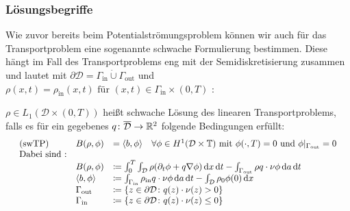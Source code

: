 \subsubsection{Lösungsbegriffe}
	Wie zuvor bereits beim Potentialströmungsproblem können wir auch für das Transportproblem eine sogenannte schwache Formulierung bestimmen. Diese hängt im Fall des Transportproblems eng mit der Semidiskretisierung zusammen und lautet mit $ \partial \mathcal{D} = \Gamma_{\text{in}} \dot{\cup} \Gamma_{\text{out}} $ und 
$\rho(x,t) = \rho_{\text{in}}(x,t) \text{ für } (x,t) \in \Gamma_{\text{in}} \times (0,T)$ :
\begin{Definition} 
	$ \rho \in L_1 (\mathcal{D} \times (0,T)) $ heißt schwache Lösung des linearen Transportproblems, falls es für ein gegebenes $ q \colon \overline{\mathcal{D}} \to \mathbb{R}^2 $ folgende Bedingungen erfüllt:
	\begin{align*}
	\begin{array}{rllll}
	&\text{(swTP)} \ &B(\rho,\phi) &= \langle b,\phi\rangle \quad \forall \phi \in H^1(\mathcal{D}\times\mathbb{T}) \text{ mit } \phi(\cdot,T) = 0 \text{ und } \phi|_{\Gamma_{\text{out}}} = 0 \\
	&\text{Dabei sind :} & & &\\
	& &B(\rho,\phi) &\coloneqq  \int_{0}^{T} \int_{\mathcal{D}} \rho (\partial_t \phi + q \nabla \phi ) \, \mathrm{d} x \, \mathrm{d} t - \int_{\Gamma_{\text{out}}} \rho q \cdot \nu \phi \, \mathrm{d} a  \, \mathrm{d} t \\
	& &\langle b,\phi \rangle &\coloneqq \int_{\Gamma_{\text{in}}} \rho_{\text{in}} q \cdot \nu \phi \, \mathrm{d} a  \, \mathrm{d} t - \int_{\mathcal{D}} \rho_0 \phi(0) \, \mathrm{d} x \\
	& & \Gamma_{\text{out}} &\coloneqq  \{ z \in \partial \mathcal{D} \colon q(z)\cdot \nu(z) > 0 \} & \\
	& & \Gamma_{\text{in}} &\coloneqq  \{ z \in \partial \mathcal{D} \colon q(z)\cdot \nu(z) \leq 0 \} &
	\end{array}\\
	\end{align*}
\end{Definition}
%	

